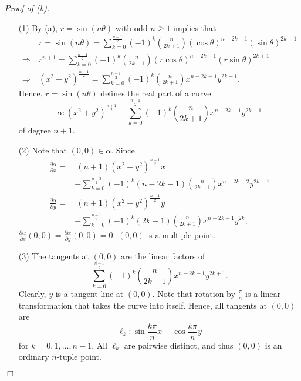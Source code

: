 \documentclass{article}
\begin{document}
\emph{Proof of (b).}
\begin{enumerate}
\item[(1)]
  By (a), $r = \sin(n\theta)$ with odd $n \geq 1$
  implies that
  \begin{align*}
    & \: r
    = \sin(n\theta)
    = \sum_{k=0}^{\frac{n-1}{2}}
      (-1)^k {n \choose 2k+1} (\cos\theta)^{n-2k-1} (\sin\theta)^{2k+1} \\
    \Longrightarrow& \:
    r^{n+1}
    = \sum_{k=0}^{\frac{n-1}{2}}
      (-1)^k {n \choose 2k+1} (r\cos\theta)^{n-2k-1} (r\sin\theta)^{2k+1} \\
    \Longrightarrow& \:
    (x^2+y^2)^{\frac{n+1}{2}}
    = \sum_{k=0}^{\frac{n-1}{2}}
      (-1)^k {n \choose 2k+1} x^{n-2k-1} y^{2k+1}.
  \end{align*}
  Hence, $r = \sin(n\theta)$ defines the real part of a curve
  \[
    \alpha: (x^2+y^2)^{\frac{n+1}{2}}
    - \sum_{k=0}^{\frac{n-1}{2}}
      (-1)^k {n \choose 2k+1} x^{n-2k-1} y^{2k+1}
  \]
  of degree $n+1$.

\item[(2)]
  Note that $(0,0) \in \alpha$.
  Since
  \begin{align*}
    \frac{\partial \alpha}{\partial x}
    =& \:
    (n+1)(x^2+y^2)^{\frac{n-1}{2}}x \\
    &- \sum_{k=0}^{\frac{n-3}{2}}
      (-1)^k (n-2k-1) {n \choose 2k+1} x^{n-2k-2} y^{2k+1} \\
    \frac{\partial \alpha}{\partial y}
    =& \:
    (n+1)(x^2+y^2)^{\frac{n-1}{2}}y \\
    &- \sum_{k=0}^{\frac{n-1}{2}}
      (-1)^k (2k+1) {n \choose 2k+1} x^{n-2k-1} y^{2k},
  \end{align*}
  $\frac{\partial \alpha}{\partial x}(0,0) = \frac{\partial \alpha}{\partial y}(0,0) = 0$.
  $(0,0)$ is a multiple point.

\item[(3)]
  The tangents at $(0,0)$ are the linear factors of
  \[
    \sum_{k=0}^{\frac{n-1}{2}} (-1)^k {n \choose 2k+1} x^{n-2k-1} y^{2k+1}.
  \]
  Clearly, $y$ is a tangent line at $(0,0)$.
  Note that rotation by $\frac{\pi}{n}$ is a linear transformation that takes the curve into itself.
  Hence, all tangents at $(0,0)$ are
  \[
    \ell_k: \sin\frac{k\pi}{n} x - \cos\frac{k\pi}{n} y
  \]
  for $k = 0, 1, \ldots, n-1$.
  All $\ell_k$ are pairwise distinct, and thus $(0,0)$ is an ordinary $n$-tuple point.
\end{enumerate}
$\Box$ \\
\end{document}
